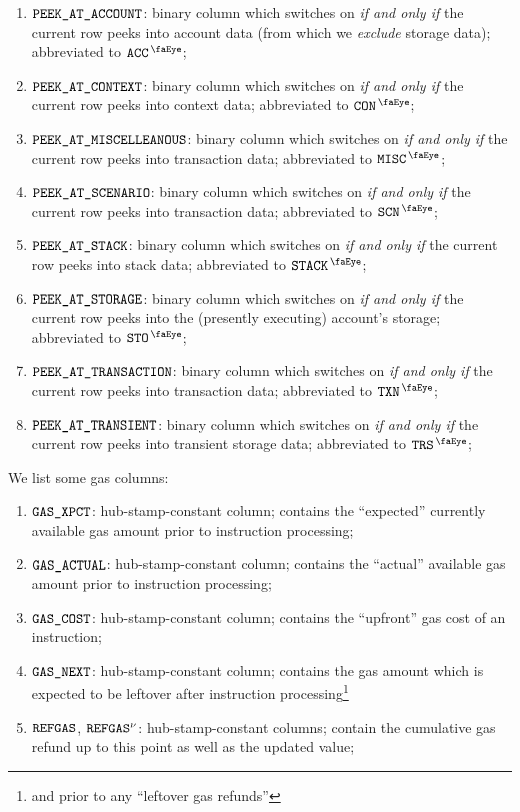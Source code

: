 \begin{enumerate}[resume]
	\item $\texttt{PEEK\_AT\_ACCOUNT}$:
		binary column which switches on \emph{if and only if} the current row peeks into account data (from which we \emph{exclude} storage data); 
		abbreviated to $\peekAccount$;
	\item $\texttt{PEEK\_AT\_CONTEXT}$:
		binary column which switches on \emph{if and only if} the current row peeks into context data; 
		abbreviated to $\peekContext$;
	\item $\texttt{PEEK\_AT\_MISCELLEANOUS}$:
		binary column which switches on \emph{if and only if} the current row peeks into transaction data; 
		abbreviated to $\peekMisc$;
	\item $\texttt{PEEK\_AT\_SCENARIO}$:
		binary column which switches on \emph{if and only if} the current row peeks into transaction data; 
		abbreviated to $\peekScenario$;
	\item $\texttt{PEEK\_AT\_STACK}$:
		binary column which switches on \emph{if and only if} the current row peeks into stack data; 
		abbreviated to $\peekStack$;
	\item $\texttt{PEEK\_AT\_STORAGE}$:
		binary column which switches on \emph{if and only if} the current row peeks into the (presently executing) account's storage; 
		abbreviated to $\peekStorage$;
	\item $\texttt{PEEK\_AT\_TRANSACTION}$:
		binary column which switches on \emph{if and only if} the current row peeks into transaction data; 
		abbreviated to $\peekTransaction$;
	\item $\texttt{PEEK\_AT\_TRANSIENT}$:
		binary column which switches on \emph{if and only if} the current row peeks into transient storage data;
		abbreviated to $\peekTransient$;
\end{enumerate}
\noindent We list some gas columns:
\begin{enumerate}[resume]
	\item $\texttt{GAS}\texttt{\_XPCT}$:
		hub-stamp-constant column; contains the ``expected'' currently available  gas amount prior to instruction processing;
	\item $\texttt{GAS}\texttt{\_ACTUAL}$:
		hub-stamp-constant column; contains the ``actual'' available  gas amount prior to instruction processing;
	\item $\texttt{GAS}\texttt{\_COST}$:
		hub-stamp-constant column; contains the ``upfront'' gas cost of an instruction;
	\item $\texttt{GAS}\texttt{\_NEXT}$:
		hub-stamp-constant column; contains the gas amount which is expected to be leftover after instruction processing\footnote{and prior to any ``leftover gas refunds''}
	\item $\texttt{REFGAS}$, $\texttt{REFGAS}^{\nu}$:
		hub-stamp-constant columns; contain the cumulative gas refund up to this point as well as the updated value;
\end{enumerate}
